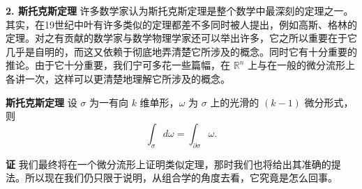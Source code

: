 \noindent\textbf{2. 斯托克斯定理}\quad
许多数学家认为斯托克斯定理是整个数学中最深刻的定理之一。其实，在19世纪中叶有许多类似的定理都差不多同时被人提出，例如高斯、格林的定理。对之有贡献的数学家与数学物理学家还可以举出许多，它之所以重要在于它几乎是自明的，而这又依赖于彻底地弄清楚它所涉及的概念。同时它有十分重要的推论。由于它十分重要，我们宁可多花一些篇幅，在 $\mathbb R^n$ 上与在一般的微分流形上各讲一次，这样可以更清楚地理解它所涉及的概念。

\noindent\textbf{斯托克斯定理}\quad
设 $\sigma$ 为一有向 $k$ 维单形，$\omega$ 为 $\sigma$ 上的光滑的 $(k-1)$ 微分形式，则
\begin{equation}
 \int_\sigma d\omega=\int_{\partial\sigma}\omega.
 \tag{16}
\end{equation}

\noindent\textbf{证}\quad
我们最终将在一个微分流形上证明类似定理，那时我们也将给出其准确的提法。所以现在我们仍只限于说明，从组合学的角度去看，它究竟是怎么回事。

